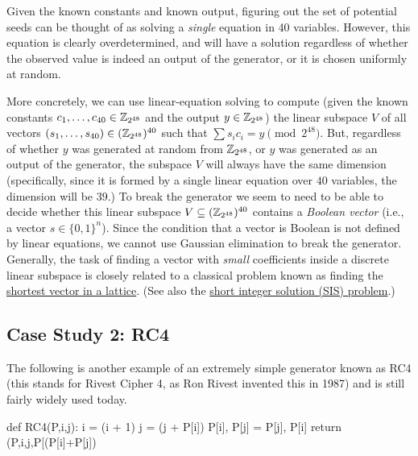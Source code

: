 
Given the known constants and known output, figuring out the set of
potential seeds can be thought of as solving a \emph{single} equation in
40 variables. However, this equation is clearly overdetermined, and will
have a solution regardless of whether the observed value is indeed an
output of the generator, or it is chosen uniformly at random.

More concretely, we can use linear-equation solving to compute (given
the known constants \(c_1,\ldots,c_{40} \in {\mathbb{Z}}_{2^{48}}\) and the output
\(y \in {\mathbb{Z}}_{2^{48}}\)) the linear subspace \(V\) of all vectors
\((s_1,\ldots,s_{40}) \in ({\mathbb{Z}}_{2^{48}})^{40}\) such that
\(\sum s_i c_i = y \pmod{2^{48}}\). But, regardless of whether \(y\) was
generated at random from \({\mathbb{Z}}_{2^{48}}\), or \(y\) was generated as an
output of the generator, the subspace \(V\) will always have the same
dimension (specifically, since it is formed by a single linear equation
over \(40\) variables, the dimension will be \(39\).) To break the
generator we seem to need to be able to decide whether this linear
subspace \(V \subseteq ({\mathbb{Z}}_{2^{48}})^{40}\) contains a \emph{Boolean
vector} (i.e., a vector \(s\in \{0,1\}^n\)). Since the condition that a
vector is Boolean is not defined by linear equations, we cannot use
Gaussian elimination to break the generator. Generally, the task of
finding a vector with \emph{small} coefficients inside a discrete linear
subspace is closely related to a classical problem known as finding the
\href{https://goo.gl/WRNT9S}{shortest vector in a lattice}. (See also
the \href{https://goo.gl/KwZWhV}{short integer solution (SIS) problem}.)

\subsection{Case Study 2: RC4}\label{3-Case-Study--RC}

The following is another example of an extremely simple generator known
as RC4 (this stands for Rivest Cipher 4, as Ron Rivest invented this in
1987) and is still fairly widely used today.

\begin{code}
def RC4(P,i,j):
    i = (i + 1) %
    j = (j + P[i]) %
    P[i], P[j] = P[j], P[i]
    return (P,i,j,P[(P[i]+P[j]) %
\end{code}

